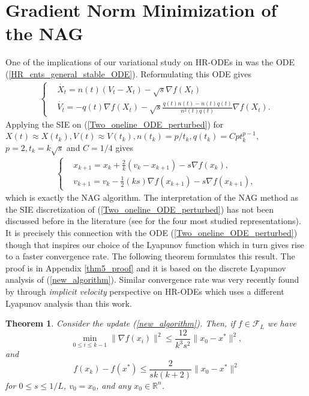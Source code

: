 \documentclass{article}
\theoremstyle{plain}
\newtheorem{theorem}{Theorem}[section]
\theoremstyle{definition}
\theoremstyle{remark}
\begin{document}
\section{Gradient Norm Minimization of the NAG}\label{section3}
One of the implications of our variational study on HR-ODEs in  was the ODE (\ref{HR_cnts_general_stable_ODE}). Reformulating this ODE gives
\begin{align}\label{Two_oneline_ODE_perturbed}
   \left\{ \begin{array}{ll}
    & \dot{X_t}   =     n(t)(V_t-X_t)-\sqrt{s}\nabla f(X_t)\\
     &\dot{V_t}    =  -q(t)\nabla f(X_t) - \sqrt{s}\frac{\dot q(t)n(t)-\dot n(t)q(t)}{n^2(t)q(t)} \nabla f(X_t).
    \end{array}\right.
\end{align}
Applying the SIE on (\ref{Two_oneline_ODE_perturbed}) for \({X(t) \approx X(t_k), V(t)\approx V(t_k),n(t_k)=p/t_k,q(t_k)=Cpt_k^{p-1},}\) 
\({ p=2,t_k=k\sqrt{s}}\) and \(C=1/4\) gives 
\begin{align}\label{new_algorithm}
   \left\{ \begin{array}{ll}
    &x_{k+1}   =    x_{k} + \frac{2}{k}(v_k-x_{k+1})-{s}\nabla f(x_k),\\
     &v_{k+1}    = v_k -\tfrac{1}{2}(ks)\nabla f(x_{k+1})-s\nabla f(x_{k+1}), 
    \end{array}\right.
\end{align}
 which is exactly the NAG algorithm. The interpretation of the NAG method as the SIE discretization of (\ref{Two_oneline_ODE_perturbed}) has not been discussed before in the literature (see \citep{ahn2022understanding} for the four most studied representations). It is precisely this connection with the ODE (\ref{Two_oneline_ODE_perturbed}) though that inspires our choice of the Lyapunov function which in turn gives rise to a faster convergence rate. The following theorem formulates this result. The proof is in Appendix \ref{thm5_proof} and it is based on the discrete Lyapunov analysis of (\ref{new_algorithm}). Similar convergence rate was very recently found by \citep{chen2022gradient} through \textit{implicit velocity} perspective on HR-ODEs which uses a different Lyapunov analysis than this work.
\begin{theorem}\label{theorem4}
    Consider the update (\ref{new_algorithm}). Then, if \(f\in\mathcal{F}_L\) we have
    \[\min_{0\leq i\leq k-1}\|\nabla f(x_i)\|^2 \leq \frac{12}{k^3s^2}\|x_0-x^*\|^2,\]
    and
    \[f(x_k)-f(x^*)\leq \frac{2}{sk(k+2)}\|x_0-x^*\|^2\]
    for \(0\leq s\leq 1/L\), \(v_0=x_0\), and any \(x_0\in \mathbb R^n\).
\end{theorem}
\end{document}
